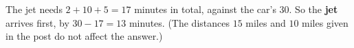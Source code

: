 The jet needs $2+10+5=17$ minutes in total, against the car's $30$. So the \textbf{jet} arrives first, by $30-17=\boxed{13}$ minutes. (The distances $15$ miles and $10$ miles given in the post do not affect the answer.)
